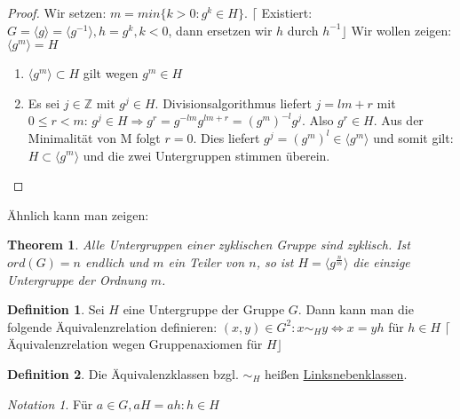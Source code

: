 \documentclass[12pt]{scrartcl}%
\newtheorem{thm}{Theorem}
\theoremstyle{definition}
\newtheorem*{defn}{Definition}
\theoremstyle{remark}
\newtheorem*{notation}{Notation}
\begin{document}
\begin{proof}
	Wir setzen: $m = min \lbrace k>0 : g^{k} \in H \rbrace$. \newline $\lceil$ Existiert: $G= \langle g \rangle = \langle g^{-1} \rangle, h = g^{k}, k<0$, dann ersetzen wir $h$ durch $h^{-1} \rfloor$ \newline Wir wollen zeigen: $\langle g^{m} \rangle = H$ 
	\begin{enumerate}
		\item $\langle g^{m} \rangle \subset H$ gilt wegen $g^{m} \in H$
		\item Es sei $j \in  \mathbb{Z}$ mit $g^{j} \in H$. Divisionsalgorithmus liefert $j=lm+r$ mit $0 \leq r < m$: $g^{j} \in H \Rightarrow g^{r}=g^{-lm}g^{lm+r}=(g^{m})^{-l}g^{j}$. Also $g^{r} \in H$. Aus der Minimalität von M folgt $r=0$. Dies liefert $g^{j}=(g^{m})^{l} \in \langle g^{m} \rangle$ und somit gilt: $H \subset \langle g^{m} \rangle$ und die zwei Untergruppen stimmen überein.
	\end{enumerate}
\end{proof}

Ähnlich kann man zeigen:

\begin{thm}
	Alle Untergruppen einer zyklischen Gruppe sind zyklisch. Ist $ord(G)=n$ endlich und $m$ ein Teiler von $n$, so ist $H = \langle g^{\frac{n}{m}}\rangle$ die einzige Untergruppe der Ordnung $m$.
\end{thm}

\begin{defn}
	Sei $H$ eine Untergruppe der Gruppe $G$. Dann kann man die folgende Äquivalenzrelation definieren: \newline $(x,y) \in G^{2}: x \sim_{H} y \Leftrightarrow x = yh$ für $h \in H$ \newline $\lceil$Äquivalenzrelation wegen Gruppenaxiomen für $H\rfloor$
\end{defn}

\begin{defn}
	Die Äquivalenzklassen bzgl. $\sim_{H}$ heißen \underline{Linksnebenklassen}.
\end{defn}

\begin{notation}
	Für $a \in G, aH = {ah : h \in H}$
\end{notation}
\end{document}
